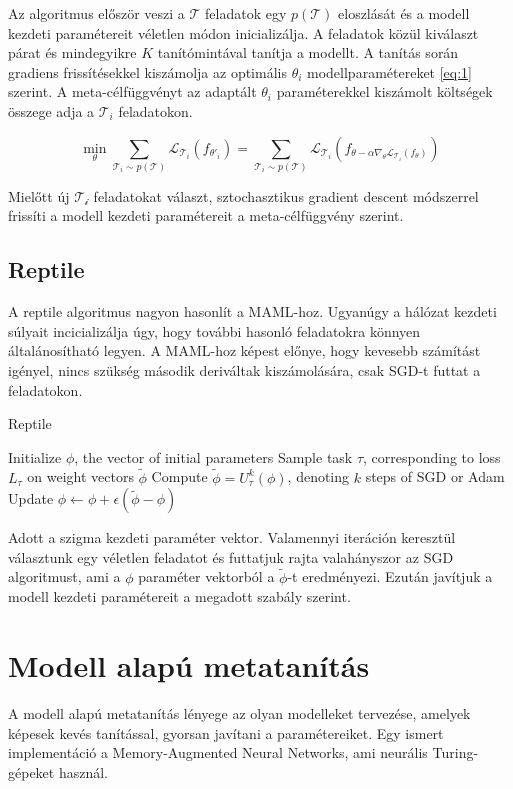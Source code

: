 Az algoritmus először veszi a $\mathcal{T}$ feladatok egy $p(\mathcal{T})$ eloszlását és a modell kezdeti paramétereit véletlen módon inicializálja. A feladatok közül kiválaszt párat és mindegyikre $K$ tanítómintával tanítja a modellt. A tanítás során gradiens frissítésekkel kiszámolja az optimális $\theta_i$ modellparamétereket \ref{eq:1} szerint. 
A meta-célfüggvényt az adaptált $\theta_i$ paraméterekkel kiszámolt költségek összege adja a $\mathcal{T}_i$ feladatokon.

\begin{equation} \label{eq:2}
\min_\theta \sum_{\mathcal{T}_i\sim p(\mathcal{T})}\mathcal{L}_{\mathcal{T}_i}(f_{\theta'_i})=
\sum_{\mathcal{T}_i\sim p(\mathcal{T})}\mathcal{L}_{\mathcal{T}_i}(f_{\theta-\alpha\nabla_{\theta}\mathcal{L}_{\mathcal{T}_i}(f_{\theta})})
\end{equation}
 
Mielőtt új $\mathcal{T_i}$ feladatokat választ, sztochasztikus gradient descent módszerrel frissíti a modell kezdeti paramétereit a meta-célfüggvény szerint.
 
\subsection{Reptile}

A reptile algoritmus nagyon hasonlít a MAML-hoz. Ugyanúgy a hálózat kezdeti súlyait incicializálja úgy, hogy további hasonló feladatokra könnyen általánosítható legyen. A MAML-hoz képest előnye, hogy kevesebb számítást igényel, nincs szükség második deriváltak kiszámolására, csak SGD-t futtat a feladatokon.


\begin{algorithm}
	\caption{Reptile}
	\label{fig:reptile-pseudo}
	\begin{algorithmic}[1]
		\State Initialize $\phi$, the vector of initial parameters
		\State Sample task $\tau$, corresponding to loss $L_{\tau}$ on weight vectors $\tilde\phi$
		\State Compute $\tilde\phi = U^k_{\tau}(\phi)$, denoting $k$ steps of SGD or Adam
		\State Update $\phi \gets \phi + \epsilon(\tilde\phi - \phi)$
		\EndFor
	\end{algorithmic}
\end{algorithm}

Adott a szigma kezdeti paraméter vektor. Valamennyi iteráción keresztül választunk egy véletlen feladatot és futtatjuk rajta valahányszor az SGD algoritmust, ami a $\phi$ paraméter vektorból a $\tilde\phi$-t eredményezi. Ezután javítjuk a modell kezdeti paramétereit a megadott szabály szerint.

\section{Modell alapú metatanítás}

A modell alapú metatanítás lényege az olyan modelleket tervezése, amelyek képesek kevés tanítással, gyorsan javítani a paramétereiket. Egy ismert implementáció a Memory-Augmented Neural Networks, ami neurális Turing-gépeket használ.

